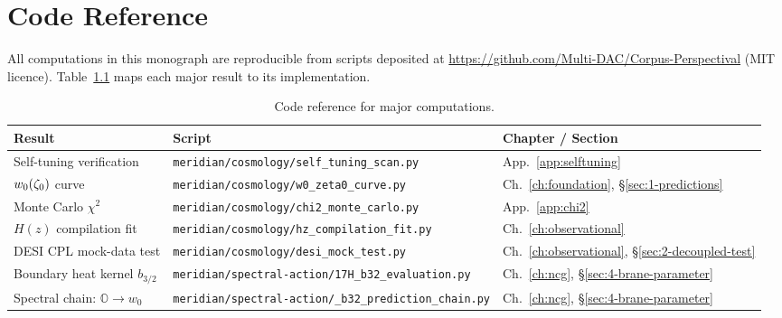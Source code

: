 
\chapter{Code Reference}
\label{app:code-reference}

All computations in this monograph are reproducible from scripts deposited at \url{https://github.com/Multi-DAC/Corpus-Perspectival} (MIT licence). Table~\ref{tab:code-ref} maps each major result to its implementation.

\begin{table}[h!]
\caption{Code reference for major computations.}
\label{tab:code-ref}
\footnotesize
\renewcommand{\arraystretch}{1.30}
\begin{tabular}{@{}p{3.8cm}p{6.5cm}p{4.2cm}@{}}
\toprule
\textbf{Result} & \textbf{Script} & \textbf{Chapter / Section} \\
\midrule

Self-tuning verification &
\texttt{meridian/cosmology/\allowbreak self\_tuning\_scan.py} &
App.~\ref{app:selftuning} \\

$w_0(\zeta_0)$ curve &
\texttt{meridian/cosmology/\allowbreak w0\_zeta0\_curve.py} &
Ch.~\ref{ch:foundation}, \S\ref{sec:1-predictions} \\

Monte Carlo $\chi^2$ &
\texttt{meridian/cosmology/\allowbreak chi2\_monte\_carlo.py} &
App.~\ref{app:chi2} \\

$H(z)$ compilation fit &
\texttt{meridian/cosmology/\allowbreak hz\_compilation\_fit.py} &
Ch.~\ref{ch:observational} \\

DESI CPL mock-data test &
\texttt{meridian/cosmology/\allowbreak desi\_mock\_test.py} &
Ch.~\ref{ch:observational}, \S\ref{sec:2-decoupled-test} \\

Boundary heat kernel $b_{3/2}$ &
\texttt{meridian/spectral-action/\allowbreak 17H\_b32\_evaluation.py} &
Ch.~\ref{ch:ncg}, \S\ref{sec:4-brane-parameter} \\

Spectral chain: $\mathbb{O} \to w_0$ &
\texttt{meridian/spectral-action/\allowbreak 17\_b32\_prediction\_chain.py} &
Ch.~\ref{ch:ncg}, \S\ref{sec:4-brane-parameter} \\


\end{tabular}
\end{table}
